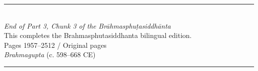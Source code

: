 \documentclass[10pt,a4paper]{article}
\newcommand{\shortline}{\noindent\rule{0.5\textwidth}{0.4pt}\par}
\begin{document}
\begin{center}
\shortline

\vspace{1em}

{\Large\textbf{}}\\[0.8cm]

{\large\textit{End of Part 3, Chunk 3 of the Brāhmasphuṭasiddhānta}}\\[0.3cm]

{\normalsize This completes the Brahmasphutasiddhanta bilingual edition.}\\[0.3cm]

{\small Pages 1957--2512 / Original pages }\\[0.3cm]

{\small\textit{Brahmagupta} (c. 598--668 CE)}

\vspace{1em}
\shortline
\end{center}
\end{document}
